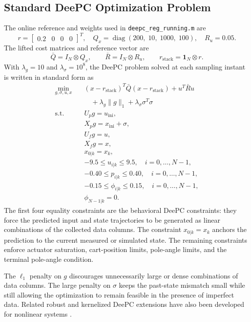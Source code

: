 \documentclass[conference]{IEEEtran}
\begin{document}
\subsection{Standard DeePC Optimization Problem}
The online reference and weights used in \texttt{deepc\_reg\_running.m} are
\[
r=
\begin{bmatrix}
0.2 & 0 & 0 & 0
\end{bmatrix}^{T},
\quad
Q_x=\operatorname{diag}(200,\;10,\;1000,\;100),
\quad
R_u=0.05.
\]
The lifted cost matrices and reference vector are
\[
\bar Q=I_N\otimes Q_x,\qquad
\bar R=I_N\otimes R_u,\qquad
r_{\mathrm{stack}}=\mathbf{1}_N\otimes r.
\]
With $\lambda_g=10$ and $\lambda_{\sigma}=10^8$, the DeePC problem solved at each sampling instant is written in standard form as
\begin{align}
\min_{g,\sigma,u,x}\quad
&
(x-r_{\mathrm{stack}})^T\bar Q(x-r_{\mathrm{stack}})
+u^T\bar R u \nonumber\\
&\quad
+\lambda_g\|g\|_1
+\lambda_{\sigma}\sigma^T\sigma
\label{eq:deepc_standard_cost}\\
\mathrm{s.t.}\quad
&U_p g=u_{\mathrm{ini}},
\label{eq:deepc_up}\\
&X_p g=x_{\mathrm{ini}}+\sigma,
\label{eq:deepc_xp}\\
&U_f g=u,
\label{eq:deepc_uf}\\
&X_f g=x,
\label{eq:deepc_xf}\\
&x_{0|k}=x_k,
\label{eq:deepc_x0}\\
&-9.5\le u_{i|k}\le 9.5,
\quad i=0,\ldots,N-1,
\label{eq:deepc_u_bounds}\\
&-0.40\le p_{i|k}\le 0.40,
\quad i=0,\ldots,N-1,
\label{eq:deepc_p_bounds}\\
&-0.15\le \phi_{i|k}\le 0.15,
\quad i=0,\ldots,N-1,
\label{eq:deepc_phi_bounds}\\
&\phi_{N-1|k}=0.
\label{eq:deepc_terminal_phi}
\end{align}
The first four equality constraints are the behavioral DeePC constraints: they force the predicted input and state trajectories to be generated as linear combinations of the collected data columns. The constraint $x_{0|k}=x_k$ anchors the prediction to the current measured or simulated state. The remaining constraints enforce actuator saturation, cart-position limits, pole-angle limits, and the terminal pole-angle condition.

The $\ell_1$ penalty on $g$ discourages unnecessarily large or dense combinations of data columns. The large penalty on $\sigma$ keeps the past-state mismatch small while still allowing the optimization to remain feasible in the presence of imperfect data. Related robust and kernelized DeePC extensions have also been developed for nonlinear systems \cite{huang2024rokdeepc}.
\end{document}
